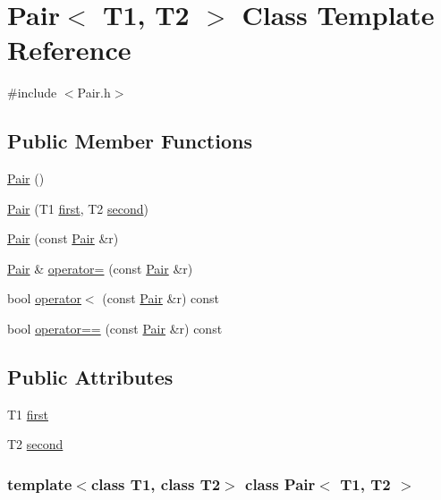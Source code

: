\hypertarget{class_pair}{
\section{Pair$<$ T1, T2 $>$ Class Template Reference}
\label{class_pair}
}


{\ttfamily \#include $<$Pair.h$>$}

\subsection*{Public Member Functions}
\begin{DoxyCompactItemize}
\item 
\hyperlink{class_pair_afdbbd798262302838fcf7ce963b8182b}{Pair} ()
\item 
\hyperlink{class_pair_acd296016a9da2ebd34c6e582bf9bc687}{Pair} (T1 \hyperlink{class_pair_a3b0b4ac2336a2228fa2af5ceebe31804}{first}, T2 \hyperlink{class_pair_af56592579c6ce0d7e03bad0fcaa5d93e}{second})
\item 
\hyperlink{class_pair_a2067d5333367a0cbc5a3dc6deffaab33}{Pair} (const \hyperlink{class_pair}{Pair} \&r)
\item 
\hyperlink{class_pair}{Pair} \& \hyperlink{class_pair_ac16244bfa58bf7b3cc2d7824c16ac249}{operator=} (const \hyperlink{class_pair}{Pair} \&r)
\item 
bool \hyperlink{class_pair_aa63d09e321533b938f87de0ebfe86940}{operator$<$} (const \hyperlink{class_pair}{Pair} \&r) const 
\item 
bool \hyperlink{class_pair_a3578a7b13595aade4bb84d7a1948d498}{operator==} (const \hyperlink{class_pair}{Pair} \&r) const 
\end{DoxyCompactItemize}
\subsection*{Public Attributes}
\begin{DoxyCompactItemize}
\item 
T1 \hyperlink{class_pair_a3b0b4ac2336a2228fa2af5ceebe31804}{first}
\item 
T2 \hyperlink{class_pair_af56592579c6ce0d7e03bad0fcaa5d93e}{second}
\end{DoxyCompactItemize}
\subsubsection*{template$<$class T1, class T2$>$ class Pair$<$ T1, T2 $>$}



